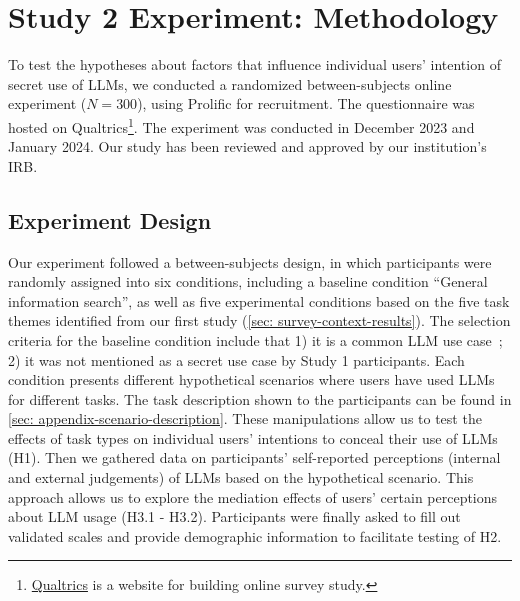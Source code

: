 \section{Study 2 Experiment: Methodology}
\label{sec:experiment}

To test the hypotheses about factors that influence individual users' intention of secret use of LLMs, we conducted a randomized between-subjects online experiment ($N=300$), using Prolific for recruitment.
The questionnaire was hosted on Qualtrics\footnote{\href{https://www.qualtrics.com/}{Qualtrics} is a website for building online survey study.}.
The experiment was conducted in December 2023 and January 2024.
Our study has been reviewed and approved by our institution’s IRB.
% 


\subsection{Experiment Design}
Our experiment followed a between-subjects design, in which participants were randomly assigned into six conditions, including a baseline condition ``General information search'', as well as five experimental conditions based on the five task themes identified from our first study (\autoref{sec: survey-context-results}).
The selection criteria for the baseline condition include that 1) it is a common LLM use case~\cite{zhang2024s}; 2) it was not mentioned as a secret use case by Study 1 participants.
Each condition presents different hypothetical scenarios where users have used LLMs for different tasks.
The task description shown to the participants can be found in \autoref{sec: appendix-scenario-description}.
These manipulations allow us to test the effects of task types on individual users' intentions to conceal their use of LLMs (H1). 
Then we gathered data on participants' self-reported perceptions (internal and external judgements) of LLMs based on the hypothetical scenario.
This approach allows us to explore the mediation effects of users' certain perceptions about LLM usage (H3.1 - H3.2).
Participants were finally asked to fill out validated scales and provide demographic information to facilitate testing of H2.



